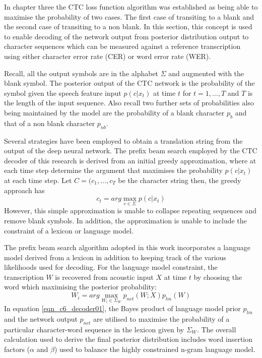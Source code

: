 In chapter three the CTC loss function algorithm was established as being able to maximise the probability of two cases.  The first case of transiting to a blank and the second case of transiting to a non blank.  In this section, this concept is used to enable decoding of the network output from posterior distribution output to character sequences which can be measured against a reference transcription using either character error rate (CER) or word error rate (WER).

Recall, all the output symbols are in the alphabet $\Sigma$ and augmented with the blank symbol. The posterior output of the CTC network is the probability of the symbol given the speech feature input $p(c|x_t)$ at time $t$ for $t=1,\dots,T$ and $T$ is the length of the input sequence.  Also recall two further sets of probabilities also being maintained by the model are the probability of a blank character $p_b$ and that of a non blank character $p_{nb}$.

Several strategies have been employed to obtain a translation string from the output of the deep neural network.  The prefix beam search employed by the CTC decoder of this research is derived from an initial greedy approximation, where at each time step determine the argument that maximises the  probability $p(c|x_t)$ at each time step. Let $C=(c_1,\dots,c_T$ be the character string then, the greedy approach has 
\begin{equation}
    c_t=arg\max_{c\in\Sigma}p(c|x_t)
\end{equation}
However, this simple approximation is unable to collapse repeating sequences and remove blank symbols. In addition, the approximation is unable to include the constraint of a lexicon or language model.

The prefix beam search algorithm \cite{hannun2014first} adopted in this work incorporates a language model derived from a lexicon in addition to keeping track of the various likelihoods used for decoding.  For the language model constraint, the transcription $W$ is recovered from acoustic input $X$ at time $t$ by choosing the word which maximising the posterior probability:
\begin{equation}
W_i=arg\max_{W_i \in \Sigma_W} p_{net}(W;X)p_{lm}(W)
\label{eqn_c6_decoder01}
\end{equation}
In equation \ref{eqn_c6_decoder01}, the Bayes product of language model prior $p_{lm}$ and the network output $p_{net}$ are utilised to maximise the probability of a particular character-word sequence in the lexicon given by $\Sigma_W$.  The overall calculation used to derive the final posterior distribution includes word insertion factors ($\alpha$ and $\beta$) used to balance the highly constrained n-gram language model.

